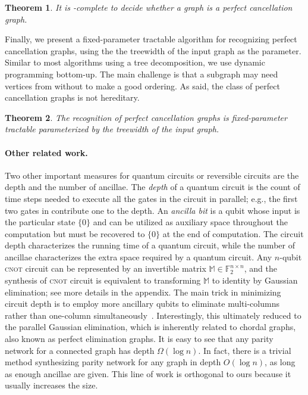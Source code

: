 \documentclass[a4paper,cleveref, autoref, 11pt, fleqn, thm-restate]{article}
\theoremstyle{plain}
\newtheorem{theorem}{Theorem}[section]
\renewcommand{\ket}[1]{\{#1\}}
\begin{document}
\begin{theorem}\label{thm:hardness-perfect-cancellation}
  It is \NP-complete to decide whether a graph is a perfect cancellation graph.
\end{theorem}

Finally, we present a fixed-parameter tractable algorithm for recognizing perfect cancellation graphs, using the the treewidth of the input graph as the parameter.
Similar to most algorithms using a tree decomposition, we use dynamic programming bottom-up.  The main challenge is that a subgraph may need vertices from without to make a good ordering.  As said, the class of perfect cancellation graphs is not hereditary.

\begin{theorem}
  \label{thm:recognition-fpt}
  The recognition of perfect cancellation graphs is fixed-parameter tractable parameterized by the treewidth of the input graph.
\end{theorem}

\paragraph*{Other related work.}

Two other important measures for quantum circuits or reversible circuits are the depth and the number of ancillae.
The \emph{depth} of a quantum circuit is the count of time steps needed to execute all the gates in the circuit in parallel; e.g., the first two gates in  contribute  one to the depth.
An \emph{ancilla bit} is a qubit whose input is the particular state $\ket{0}$ and can be utilized as auxiliary space throughout the computation but must be recovered to $\ket{0}$ at the end of computation.
The circuit depth characterizes the running time of a quantum circuit, while the number of ancillae characterizes the extra space required by a quantum circuit.
Any $n$-qubit \textsc{cnot} circuit can be represented by an invertible matrix $\mathbb{M} \in \mathbb{F}_2^{n \times n}$, and the synthesis of \textsc{cnot} circuit is equivalent to transforming $\mathbb{M}$ to identity by Gaussian elimination; see more details in the appendix.
The main trick in minimizing circuit depth is to employ more ancillary qubits to eliminate multi-columns rather than one-column simultaneously~\cite{10.5555/3381089.3381102,Maslov2022,Goubault2024}.  Interestingly, this ultimately reduced to the parallel Gaussian elimination, which is inherently related to chordal graphs, also known as perfect elimination graphs.
It is easy to see that any parity network for a connected graph has depth $\Omega(\log n)$.  In fact, there is a trivial method synthesizing parity network for any graph in depth $O(\log n)$, as long as enough ancillae are given.
This line of work is orthogonal to ours because it usually increases the size.
\end{document}

